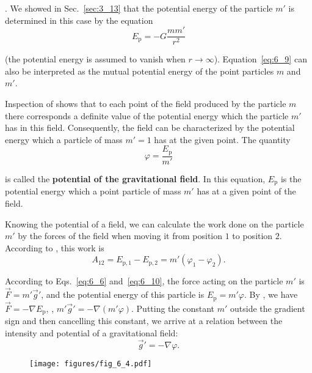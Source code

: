 . We showed in Sec.~\ref{sec:3_13} that the potential energy of the particle $m'$ is determined in this case by the equation
\begin{equation}\label{eq:6_9}
	E_{\text{p}} = -G\frac{mm'}{r^2}
\end{equation}

\noindent
(the potential energy is assumed to vanish when $r\to\infty$). Equation~\eqref{eq:6_9} can also be interpreted as the mutual potential energy of the point particles $m$ and $m'$.

Inspection of  shows that to each point of the field produced by the particle $m$ there corresponds a definite value of the potential energy which the particle $m'$ has in this field. Consequently, the field can be characterized by the potential energy which a particle of mass $m'=1$ has at the given point. The quantity
\begin{equation}\label{eq:6_10}
	\varphi = \frac{E_{\text{p}}}{m'}
\end{equation}

\noindent
is called the \textbf{potential of the gravitational field}. In this equation, $E_{\text{p}}$ is the potential energy which a point particle of mass $m'$ has at a given point of the field.

Knowing the potential of a field, we can calculate the work done on the particle $m'$ by the forces of the field when moving it from position $1$ to position $2$. According to , this work is
\begin{equation}\label{eq:6_11}
	A_{12} = E_{\text{p},1} - E_{\text{p},2} = m'(\varphi_1 - \varphi_2).
\end{equation}

According to Eqs.~\eqref{eq:6_6} and~\eqref{eq:6_10}, the force acting on the particle $m'$ is $\vec{F}=m'\vec{g}'$, and the potential energy of this particle is $E_{\text{p}}=m'\varphi$. By , we have $\vec{F}=-\nabla E_{\text{p}}$, \ie, $m'\vec{g}'=-\nabla(m'\varphi)$. Putting the constant $m'$ outside the gradient sign and then cancelling this constant, we arrive at a relation between the intensity and potential of a gravitational field:
\begin{equation}\label{eq:6_12}
	\vec{g}' = -\nabla\varphi.
\end{equation}

\begin{figure}[t]
	\begin{center}
		\texttt{[image: figures/fig\_6\_4.pdf]}
		\caption[]{}
		\label{fig:6_4}
	\end{center}
	\vspace{-0.7cm}
\end{figure}

